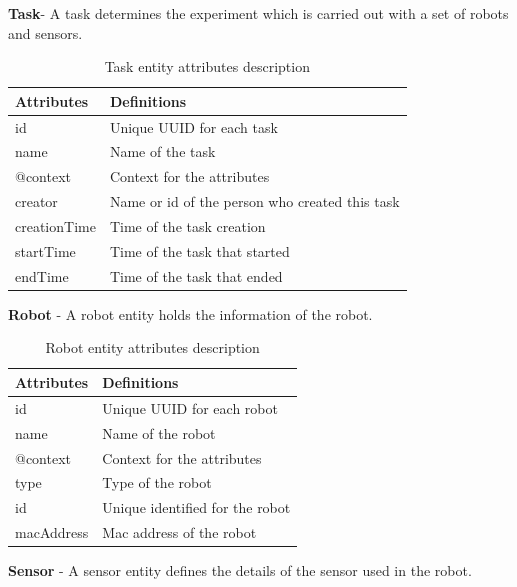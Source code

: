 	\textbf{Task}- A task determines the experiment which is carried out with a set of robots and sensors. 
	
	\begin{table}[!htbp]
		\begin{tabular}{|l|p{8cm}|}
			\hline
			\textbf{Attributes} & \textbf{Definitions} \\ \hline
			id & Unique UUID for each task \\ \hline
			name &  Name of the task \\ \hline
			@context &  Context for the attributes\\ \hline
			creator &  Name or id of the person who created this task\\ \hline
			creationTime &  Time of the task creation\\ \hline
			startTime & Time of the task that started\\ \hline
			endTime &  Time of the task that ended\\ \hline
			
		\end{tabular}
		\caption{Task entity attributes description}
		\label{tab:task_entity}
	\end{table}

	\textbf{Robot} - A robot entity holds the information of the robot.
	
	\begin{table}[!htbp]
		\begin{tabular}{|l|p{8cm}|}
			\hline
			\textbf{Attributes} & \textbf{Definitions} \\ \hline
			id & Unique UUID for each robot \\ \hline
			name & Name of the robot \\ \hline
			@context & Context for the attributes \\ \hline
			type & Type of the robot \\ \hline
			id & Unique identified for the robot \\ \hline
			macAddress & Mac address of the robot \\ \hline
			
		\end{tabular}
		\caption{Robot entity attributes description}
		\label{tab:robot_entity}
	\end{table}

	\textbf{Sensor} - A sensor entity defines the details of the sensor used in the robot.

